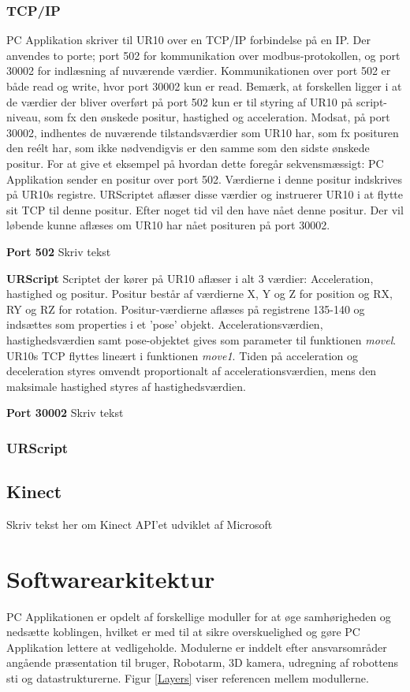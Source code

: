 \subsubsection{TCP/IP}
PC Applikation skriver til UR10 over en TCP/IP forbindelse på en IP. Der anvendes to porte; port 502 for kommunikation over modbus-protokollen, og port 30002 for indlæsning af nuværende værdier.
Kommunikationen over port 502 er både read og write, hvor port 30002 kun er read. 
Bemærk, at forskellen  ligger i at de værdier der bliver overført på port 502 kun er til styring af UR10 på script-niveau, som fx den ønskede positur, hastighed og acceleration. Modsat, på port 30002, indhentes de nuværende tilstandsværdier som UR10 har, som fx posituren den reélt har, som ikke nødvendigvis er den samme som den sidste ønskede positur.
For at give et eksempel på hvordan dette foregår sekvensmæssigt:
PC Applikation sender en positur over port 502. Værdierne i denne positur indskrives på UR10s registre.
URScriptet aflæser disse værdier og instruerer UR10 i at flytte sit TCP til denne positur.
Efter noget tid vil den have nået denne positur. Der vil løbende kunne aflæses om UR10 har nået posituren på port 30002.

\textbf{Port 502}
Skriv tekst

\textbf{URScript}
Scriptet der kører på UR10 aflæser i alt 3 værdier:
Acceleration, hastighed og positur.
Positur består af værdierne X, Y og Z for position og RX, RY og RZ for rotation.
Positur-værdierne aflæses på registrene 135-140 og indsættes som properties i et 'pose' objekt.
Accelerationsværdien, hastighedsværdien samt pose-objektet gives som parameter til funktionen \textit{movel}.
UR10s TCP flyttes lineært i funktionen \textit{move1}. Tiden på acceleration og deceleration styres omvendt proportionalt af accelerationsværdien, mens den maksimale hastighed styres af hastighedsværdien.

\textbf{Port 30002}
Skriv tekst 

\subsubsection{URScript}

\subsection{Kinect}
Skriv tekst her om Kinect API'et udviklet af Microsoft
\newpage

\section{Softwarearkitektur}
PC Applikationen er opdelt af forskellige moduller for at øge samhørigheden og nedsætte koblingen, hvilket er med til at sikre overskuelighed og gøre PC Applikation lettere at vedligeholde. Modulerne er inddelt efter ansvarsområder angående præsentation til bruger, Robotarm, 3D kamera, udregning af robottens sti og datastrukturerne. Figur \ref{Layers} viser referencen mellem modullerne. 

